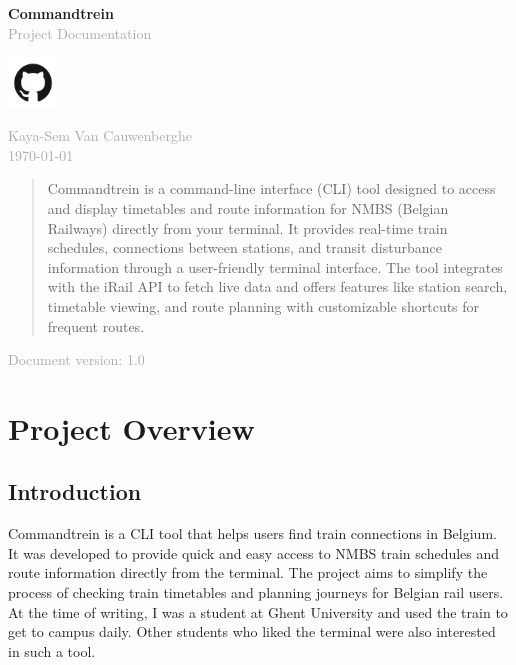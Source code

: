 \documentclass[10pt,a4paper]{article}
\newcommand{\projecttitle}[1]{
    \begin{center}
        {\Huge\bfseries\color{primary} #1}\\
        \vspace{0.5cm}
        \textcolor{darkgray}{\large Project Documentation}
    \end{center}
}
\begin{document}
\begin{titlepage}
	\centering
	\vspace*{2cm}

	\projecttitle{Commandtrein}

	\vspace{1cm}

	\vspace{1cm}
	\begin{center}
		\href{https://github.com/Kaya-Sem/commandtrein}{\includegraphics[width=0.1\textwidth]{images/github-mark.png}}
	\end{center}

	\vspace{1cm}

	\textcolor{darkgray}{\large Kaya-Sem Van Cauwenberghe}\\
	\textcolor{darkgray}{\today}

	\vfill

	\begin{abstract}
		\noindent
		Commandtrein is a command-line interface (CLI) tool designed to access and display timetables and route information for NMBS (Belgian Railways) directly from your terminal. It provides real-time train schedules, connections between stations, and transit disturbance information through a user-friendly terminal interface. The tool integrates with the iRail API to fetch live data and offers features like station search, timetable viewing, and route planning with customizable shortcuts for frequent routes.
	\end{abstract}

	\vspace{1cm}

	\small
	\textcolor{darkgray}{Document version: 1.0}
\end{titlepage}

\newpage

\section{Project Overview}
\subsection{Introduction}
Commandtrein is a CLI tool that helps users find train connections in Belgium. It was developed to provide quick and easy access to NMBS train schedules and route information directly from the terminal. The project aims to simplify the process of checking train timetables and planning journeys for
Belgian rail users. At the time of writing, I was a student at Ghent University and used the train to get to campus daily. Other students who liked the terminal were also interested in such a tool.
\end{document}
